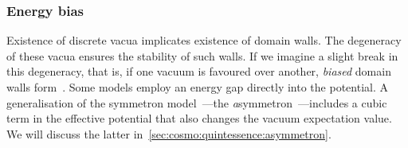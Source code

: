     \subsubsection{Energy bias}
        Existence of discrete vacua implicates existence of domain walls. The degeneracy of these vacua ensures the stability of such walls. If we imagine a slight break in this degeneracy, that is, if one vacuum is favoured over another, \emph{biased} domain walls form~\citep{vachaspatiKinksDomainWalls2006}. Some models employ an energy gap directly into the potential. A generalisation of the symmetron model~\citep{hinterbichlerSymmetronCosmology2011}---the \emph{a}symmetron~\citep{perivolaropoulosGravitationalTransitionsExplicitly2022}---includes a cubic term in the effective potential that also changes the vacuum expectation value. We will discuss the latter in~\cref{sec:cosmo:quintessence:asymmetron}.







    



    
    




    